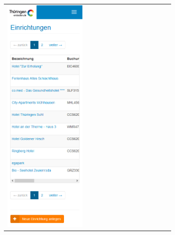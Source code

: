 \begin{figure}[htb]
	\begin{tabular}{l r}
		\includegraphics[width=0.49\textwidth]{Bilder/Barrierefreidatenbank-mobil}
		&

\end{tabular}
\end{figure}
